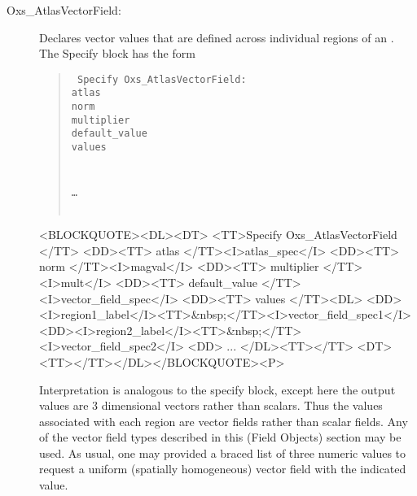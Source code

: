 \begin{description}
%
\item[Oxs\_AtlasVectorField:\label{item:AtlasVectorField}]
   Declares vector values that are defined across individual regions of
   an .  The Specify block has the form
      \begin{latexonly}
      \begin{quote}\tt
      Specify Oxs\_AtlasVectorField: \ocb\\
       \bi atlas \\
       \bi norm \\
       \bi multiplier \\
       \bi default\_value \\
       \bi values \ocb\\
       \bi\bi{}\\
       \bi\bi{}\\
       \bi\bi \ldots\\
       \bi\ccb\\
      \ccb
      \end{quote}
      \end{latexonly}
      \begin{rawhtml}
      <BLOCKQUOTE><DL><DT>
      <TT>Specify Oxs_AtlasVectorField {</TT>
      <DD><TT> atlas </TT><I>atlas_spec</I>
      <DD><TT> norm </TT><I>magval</I>
      <DD><TT> multiplier </TT><I>mult</I>
      <DD><TT> default_value </TT><I>vector_field_spec</I>
      <DD><TT> values {</TT><DL>
          <DD><I>region1_label</I><TT>&nbsp;</TT><I>vector_field_spec1</I>
          <DD><I>region2_label</I><TT>&nbsp;</TT><I>vector_field_spec2</I>
          <DD> ...
      </DL><TT>}</TT>
      <DT><TT>}</TT></DL></BLOCKQUOTE><P>
      \end{rawhtml}
   Interpretation is analogous to the
   specify block, except here the output values are 3 dimensional
   vectors rather than scalars.  Thus the values associated with each
   region are vector fields rather than scalar fields.  Any of the
   vector field types described in this (Field Objects) section may be
   used.  As usual, one may provided a braced list of three numeric
   values to request a uniform (spatially homogeneous) vector field with
   the indicated value.


\end{description}
